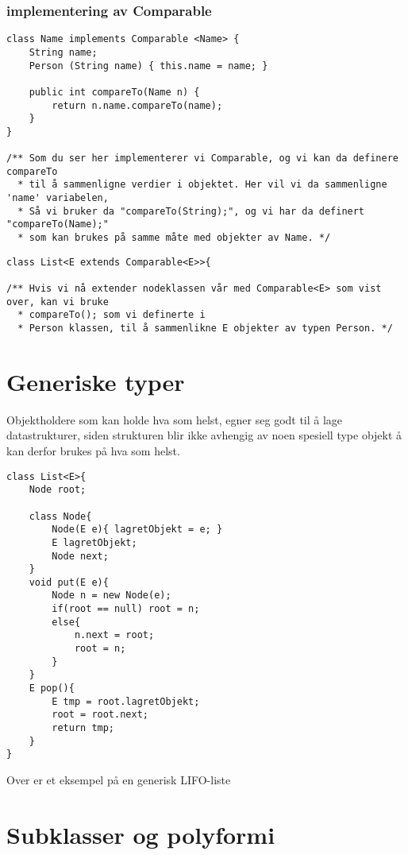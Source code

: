 \documentclass[11pt]{article}
\begin{document}
\subsubsection{implementering av Comparable}
\label{sec-14-2}


\begin{verbatim}
class Name implements Comparable <Name> {
    String name;
    Person (String name) { this.name = name; }

    public int compareTo(Name n) {
        return n.name.compareTo(name);
    }
}

/** Som du ser her implementerer vi Comparable, og vi kan da definere compareTo 
  * til å sammenligne verdier i objektet. Her vil vi da sammenligne 'name' variabelen, 
  * Så vi bruker da "compareTo(String);", og vi har da definert "compareTo(Name);" 
  * som kan brukes på samme måte med objekter av Name. */
\end{verbatim}

\begin{verbatim}
class List<E extends Comparable<E>>{

/** Hvis vi nå extender nodeklassen vår med Comparable<E> som vist over, kan vi bruke 
  * compareTo(); som vi definerte i 
  * Person klassen, til å sammenlikne E objekter av typen Person. */
\end{verbatim}
\section{Generiske typer}
\label{sec-14}

Objektholdere som kan holde hva som helst, egner seg godt til å lage datastrukturer, siden strukturen blir ikke avhengig av noen spesiell type objekt å
kan derfor brukes på hva som helst. 


\begin{verbatim}
class List<E>{
    Node root;

    class Node{
        Node(E e){ lagretObjekt = e; } 
        E lagretObjekt;
        Node next;
    }    
    void put(E e){
        Node n = new Node(e);
        if(root == null) root = n;
        else{ 
            n.next = root; 
            root = n;
        }
    }    
    E pop(){
        E tmp = root.lagretObjekt;
        root = root.next;
        return tmp;
    }
}
\end{verbatim}

Over er et eksempel på en generisk LIFO-liste
\section{Subklasser og polyformi}
\label{sec-15}
\end{document}
